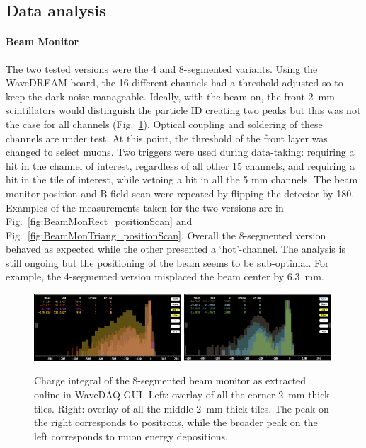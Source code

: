 \begin{refsection}
    \subsection{Data analysis}
        \paragraph{Beam Monitor}
        The two tested versions were the 4 and 8-segmented variants.
        Using the WaveDREAM board, the 16 different channels had a threshold adjusted so to keep the dark noise manageable.
        Ideally, with the beam on, the front \SI{2}{mm} scintillators would distinguish the particle ID creating two peaks but this was not the case for all channels (Fig.~\ref{fig:BeamMonRect_pulsesDefaultThresh}). 
        Optical coupling and soldering of these channels are under test.
        At this point, the threshold of the front layer was changed to select muons.
        Two triggers were used during data-taking: requiring a hit in the channel of interest, regardless of all other 15 channels, and requiring a hit in the tile of interest, while vetoing a hit in all the 5 mm channels.
        The beam monitor position and B field scan were repeated by flipping the detector by \SI{180}{\deg}.
        Examples of the measurements taken for the two versions are in Fig.~\ref{fig:BeamMonRect_positionScan} and Fig.~\ref{fig:BeamMonTriang_positionScan}. 
        Overall the 8-segmented version behaved as expected while the other presented a `hot'-channel.
        The analysis is still ongoing but the positioning of the beam seems to be sub-optimal. 
        For example, the 4-segmented version misplaced the beam center by \SI{6.3}{mm}.


        \begin{figure}
            \centering
            \includegraphics[width=0.49\textwidth]{Figures/muEDM_Dec2023/Corner_overlay_TueHVset_rect.png}
            \includegraphics[width=0.49\textwidth]{Figures/muEDM_Dec2023/Middle_overlay_TueHVset_rect.png}
            \caption[muEDM 2023: Beam monitor charge distributions]{Charge integral of the 8-segmented beam monitor as extracted online in WaveDAQ GUI. Left: overlay of all the corner 2~mm thick tiles. Right: overlay of all the middle 2~mm thick tiles. The peak on the right corresponds to positrons, while the broader peak on the left corresponds to muon energy depositions.}
            \label{fig:BeamMonRect_pulsesDefaultThresh}
        \end{figure}
        

\end{refsection}
